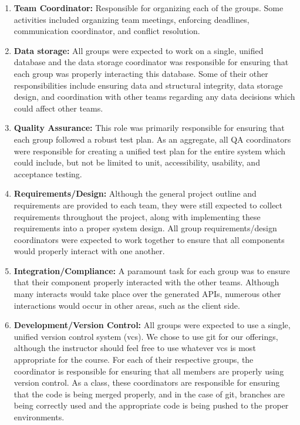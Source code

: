 \documentclass{sig-alternate-05-2015}
\begin{document}
\begin{enumerate}

	\item \textbf{Team Coordinator:} Responsible for organizing each of the groups. Some activities included organizing team meetings, enforcing deadlines, communication coordinator, and conflict resolution.
	\item \textbf{Data storage:} All groups were expected to work on a single, unified database and the data storage coordinator was responsible for ensuring that each group was properly interacting this database. Some of their other responsibilities include ensuring data and structural integrity, data storage design, and coordination with other teams regarding any data decisions which could affect other teams. 
	\item \textbf{Quality Assurance:} This role was primarily responsible for ensuring that each group followed a robust test plan. As an aggregate, all QA coordinators were responsible for creating a unified test plan for the entire system which could include, but not be limited to unit, accessibility, usability, and acceptance testing.
	\item \textbf{Requirements/Design:} Although the general project outline and requirements are provided to each team, they were still expected to collect requirements throughout the project, along with implementing these requirements into a proper system design. All group requirements/design coordinators were expected to work together to ensure that all components would properly interact with one another.
	\item \textbf{Integration/Compliance:} A paramount task for each group was to ensure that their component properly interacted with the other teams. Although many interacts would take place over the generated APIs, numerous other interactions would occur in other areas, such as the client side.
	\item \textbf{Development/Version Control:} All groups were expected to use a single, unified version control system (vcs). We chose to use git for our offerings, although the instructor should feel free to use whatever vcs is most appropriate for the course. For each of their respective groups, the coordinator is responsible for ensuring that all members are properly using version control. As a class, these coordinators are responsible for ensuring that the code is being merged properly, and in the case of git, branches are being correctly used and the appropriate code is being pushed to the proper environments.


\end{enumerate}
\end{document}
